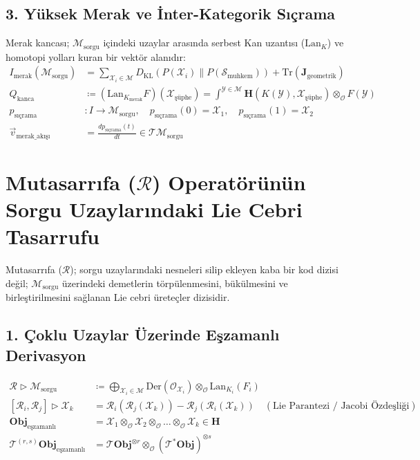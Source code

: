 \documentclass[11pt, a4paper]{article}
\begin{document}
\subsection{3. Yüksek Merak ve İnter-Kategorik Sıçrama}
Merak kancası; $\mathcal{M}_{\text{sorgu}}$ içindeki uzaylar arasında serbest Kan uzantısı ($\text{Lan}_K$) ve homotopi yolları kuran bir vektör alanıdır:
\begin{align}
I_{\text{merak}}(\mathcal{M}_{\text{sorgu}}) &= \sum_{\mathcal{X}_i \in \mathcal{M}} D_{\text{KL}}\left( P(\mathcal{X}_i) \parallel P(\mathcal{S}_{\text{muhkem}}) \right) + \text{Tr}(\mathbf{J}_{\text{geometrik}}) \\
Q_{\text{kanca}} &\coloneqq (\text{Lan}_{K_{\text{merak}}} F)(\mathcal{X}_{\text{şüphe}}) = \int^{\mathcal{Y} \in \mathcal{M}} \mathbf{H}(K(\mathcal{Y}), \mathcal{X}_{\text{şüphe}}) \otimes_{\mathcal{O}} F(\mathcal{Y}) \\
p_{\text{sıçrama}} &: I \longrightarrow \mathcal{M}_{\text{sorgu}}, \quad p_{\text{sıçrama}}(0) = \mathcal{X}_1, \quad p_{\text{sıçrama}}(1) = \mathcal{X}_2 \\
\vec{v}_{\text{merak\_akışı}} &= \frac{d p_{\text{sıçrama}}(t)}{dt} \in \mathcal{T}\mathcal{M}_{\text{sorgu}}
\end{align}

\section{Mutasarrıfa ($\mathcal{R}$) Operatörünün Sorgu Uzaylarındaki Lie Cebri Tasarrufu}

Mutasarrıfa ($\mathcal{R}$); sorgu uzaylarındaki nesneleri silip ekleyen kaba bir kod dizisi değil; $\mathcal{M}_{\text{sorgu}}$ üzerindeki demetlerin törpülenmesini, bükülmesini ve birleştirilmesini sağlanan Lie cebri üreteçler dizisidir.

\subsection{1. Çoklu Uzaylar Üzerinde Eşzamanlı Derivasyon}
\begin{align}
\mathcal{R} \triangleright \mathcal{M}_{\text{sorgu}} &\coloneqq \bigoplus_{\mathcal{X}_i \in \mathcal{M}} \text{Der}(\mathcal{O}_{\mathcal{X}_i}) \otimes_{\mathcal{O}} \text{Lan}_{K_i}(F_i) \\
[\mathcal{R}_i, \mathcal{R}_j] \triangleright \mathcal{X}_k &= \mathcal{R}_i(\mathcal{R}_j(\mathcal{X}_k)) - \mathcal{R}_j(\mathcal{R}_i(\mathcal{X}_k)) \quad (\text{Lie Parantezi / Jacobi Özdeşliği}) \\
\mathbf{Obj}_{\text{eşzamanlı}} &= \mathcal{X}_1 \otimes_{\mathcal{O}} \mathcal{X}_2 \otimes_{\mathcal{O}} \dots \otimes_{\mathcal{O}} \mathcal{X}_k \in \mathbf{H} \\
\mathcal{T}^{(r,s)} \mathbf{Obj}_{\text{eşzamanlı}} &= \mathcal{T} \mathbf{Obj}^{\otimes r} \otimes_{\mathcal{O}} (\mathcal{T}^* \mathbf{Obj})^{\otimes s}
\end{align}
\end{document}
